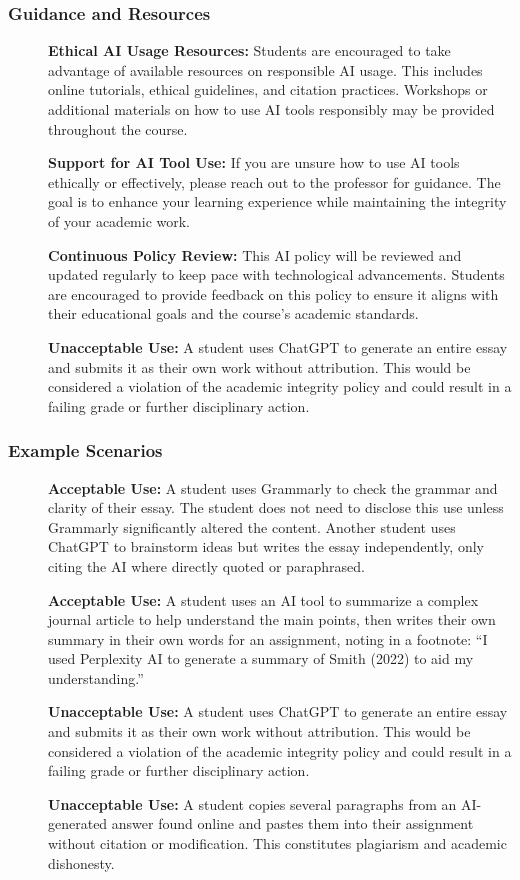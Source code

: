 \documentclass[11pt, letterpaper]{article}
\begin{document}
\subsubsection*{Guidance and Resources}
\begin{description}
    \item[] \textbf{Ethical AI Usage Resources:} Students are encouraged to take advantage of available resources on responsible AI usage. This includes online tutorials, ethical guidelines, and citation practices. Workshops or additional materials on how to use AI tools responsibly may be provided throughout the course.
    \item[] \textbf{Support for AI Tool Use:} If you are unsure how to use AI tools ethically or effectively, please reach out to the professor for guidance. The goal is to enhance your learning experience while maintaining the integrity of your academic work.
    \item[] \textbf{Continuous Policy Review:} This AI policy will be reviewed and updated regularly to keep pace with technological advancements. Students are encouraged to provide feedback on this policy to ensure it aligns with their educational goals and the course's academic standards.
    \item[] \textbf{Unacceptable Use:} A student uses ChatGPT to generate an entire essay and submits it as their own work without attribution. This would be considered a violation of the academic integrity policy and could result in a failing grade or further disciplinary action.
\end{description}

\subsubsection*{Example Scenarios}
\begin{description}
    \item[] \textbf{Acceptable Use:} A student uses Grammarly to check the grammar and clarity of their essay. The student does not need to disclose this use unless Grammarly significantly altered the content. Another student uses ChatGPT to brainstorm ideas but writes the essay independently, only citing the AI where directly quoted or paraphrased.
    \item[] \textbf{Acceptable Use:} A student uses an AI tool to summarize a complex journal article to help understand the main points, then writes their own summary in their own words for an assignment, noting in a footnote: ``I used Perplexity AI to generate a summary of Smith (2022) to aid my understanding.''
    \item[] \textbf{Unacceptable Use:} A student uses ChatGPT to generate an entire essay and submits it as their own work without attribution. This would be considered a violation of the academic integrity policy and could result in a failing grade or further disciplinary action.
    \item[] \textbf{Unacceptable Use:} A student copies several paragraphs from an AI-generated answer found online and pastes them into their assignment without citation or modification. This constitutes plagiarism and academic dishonesty.
\end{description}
\end{document}
